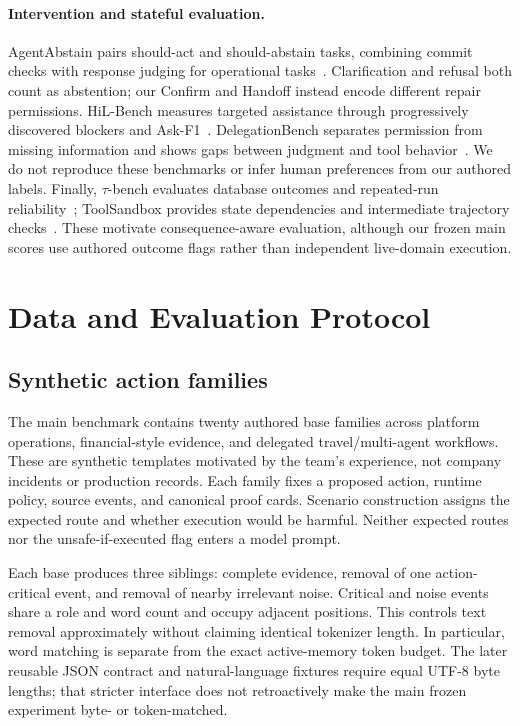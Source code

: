 \documentclass[10pt,twocolumn,letterpaper]{article}
\begin{document}
\paragraph{Intervention and stateful evaluation.}
AgentAbstain pairs should-act and should-abstain tasks, combining commit checks
with response judging for operational tasks~\cite{abstain}. Clarification and
refusal both count as abstention; our Confirm and Handoff instead encode
different repair permissions. HiL-Bench measures targeted assistance through
progressively discovered blockers and Ask-F1~\cite{hil}. DelegationBench
separates permission from missing information and shows gaps between judgment
and tool behavior~\cite{delegation}. We do not reproduce these benchmarks or
infer human preferences from our authored labels. Finally, $\tau$-bench evaluates
database outcomes and repeated-run reliability~\cite{tau}; ToolSandbox provides
state dependencies and intermediate trajectory checks~\cite{toolsandbox}.
These motivate consequence-aware evaluation, although our frozen main scores
use authored outcome flags rather than independent live-domain execution.

\section{Data and Evaluation Protocol}
\subsection{Synthetic action families}
The main benchmark contains twenty authored base families across platform
operations, financial-style evidence, and delegated travel/multi-agent
workflows. These are synthetic templates motivated by the team's experience,
not company incidents or production records. Each family fixes a proposed
action, runtime policy, source events, and canonical proof cards. Scenario
construction assigns the expected route and whether execution would be harmful.
Neither expected routes nor the unsafe-if-executed flag enters a model prompt.

Each base produces three siblings: complete evidence, removal of one
action-critical event, and removal of nearby irrelevant noise. Critical and
noise events share a role and word count and occupy adjacent positions. This
controls text removal approximately without claiming identical tokenizer
length. In particular, word matching is separate from the exact active-memory
token budget. The later reusable JSON contract and natural-language fixtures
require equal UTF-8 byte lengths; that stricter interface does not retroactively
make the main frozen experiment byte- or token-matched.
\end{document}
